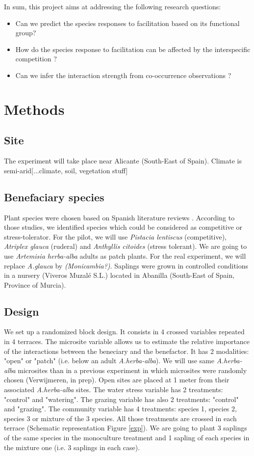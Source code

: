 \documentclass[12pt, a4paper]{article} %
\begin{document}
In sum, this project aims at addressing the following research questions:
\begin{itemize}
	\item Can we predict the species responses to facilitation based on its functional group? 
	\item How do the species response to facilitation can be affected by the interspecific competition ?
	\item Can we infer the interaction strength from co-occurrence observations ?
\end{itemize}


\section{Methods}
\subsection{Site}
The experiment will take place near Alicante (South-East of Spain). Climate is semi-arid[...climate, soil, vegetation stuff]

\subsection{Benefaciary species}
Plant species were chosen based on Spanish literature reviews \citep{McCluney2012,Navarro2006, Jauffret2003}. According to those studies, we identified species which could be considered as competitive or stress-tolerator. For the pilot, we will use \textit{Pistacia lentiscus} (competitive), \textit{Atriplex glauca} (ruderal) and \textit{Anthyllis citoides} (stress tolerant). We are going to use \textit{Artemisia herba-alba} adults as patch plants. For the real experiment, we will replace \textit{A.glauca} by \textit{(Monicambia?)}. 
Saplings were grown in controlled conditions in a nursery (Viveros Muzalé S.L.) located in Abanilla (South-East of Spain, Province of Murcia).

\subsection{Design}
We set up a randomized block design. It consists in 4 crossed variables repeated in 4 terraces. The microsite variable allows us to estimate the relative importance of the interactions between the beneciary and the benefactor. It has 2 modalities: "open" or "patch" (i.e. below an adult \textit{A.herba-alba}). We will use same \textit{A.herba-alba} microsites than in a previous experiment in which microsites were randomly chosen (Verwijmeren, in prep). Open sites are placed at 1 meter from their associated \textit{A.herba-alba} sites. The water stress variable has 2 treatments: "control" and "watering". The grazing variable has also 2 treatments: "control" and "grazing". The community variable has 4 treatments: species 1, species 2, species 3 or mixture of the 3 species. All those treatments are crossed in each terrace (Schematic representation Figure \ref{exp}). We are going to plant 3 saplings of the same species in the monoculture treatment and 1 sapling of each species in the mixture one (i.e. 3 saplings in each case).
\end{document}

